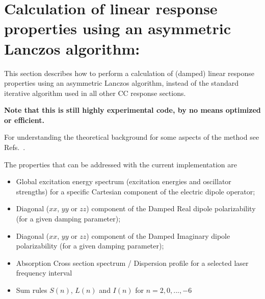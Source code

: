 
\section{Calculation of linear response properties using an asymmetric Lanczos algorithm: }\label{sec:cclrlanczos}

This section describes how to perform a calculation of (damped) 
linear response properties using an asymmetric Lanczos algorithm, 
instead of the standard iterative algorithm used in all other CC response sections.

{\bf Note that this is still highly experimental code, by no means optimized or efficient.}

For understanding the theoretical background for some
aspects of the method see Refs.\ \cite{Coriani:JCTC8,Coriani:PRA85}.

The properties that can be addressed with the current implementation are
\begin{itemize}
\item Global excitation energy spectrum (excitation energies and oscillator strengths) for a 
specific Cartesian component of the electric dipole operator;
\item Diagonal ($xx$, $yy$ or $zz$) component of the Damped 
Real dipole polarizability (for a given damping parameter);
\item Diagonal ($xx$, $yy$ or $zz$) component of the Damped 
Imaginary  dipole polarizability (for a given damping parameter);
\item Absorption Cross section spectrum / Dispersion profile for a selected 
laser frequency interval
\item Sum rules $S(n)$, $L(n)$ and $I(n)$ for $n=2,0,...,-6$
\end{itemize}

\begin{center}
\end{center}

